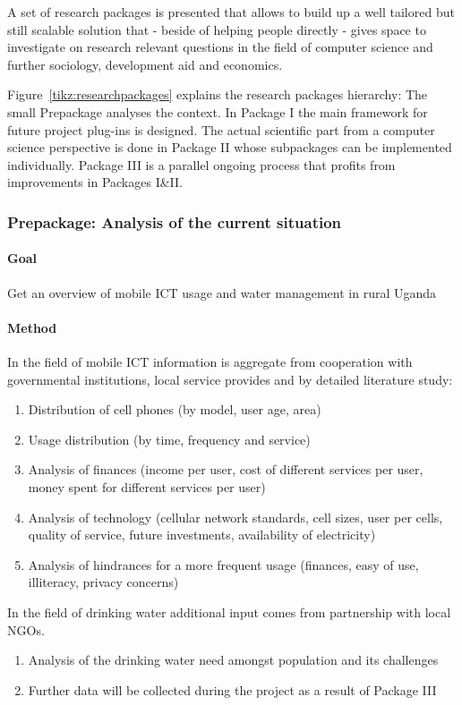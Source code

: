 \documentclass[11pt]{article}
\begin{document}
A set of research packages is presented that allows to build up a well tailored but still scalable solution that - beside of helping people directly -  gives space to investigate on research relevant questions in the field of computer science and further sociology, development aid and economics. 

Figure~\ref{tikz:researchpackages} explains the research packages hierarchy: The small Prepackage analyses the context. In Package I the main framework for future project plug-ins is designed. The actual scientific part from a computer science perspective is done in Package II whose subpackages can be implemented individually. Package III is a parallel ongoing process that profits from improvements in Packages I\&II.


\subsubsection*{Prepackage: Analysis of the current situation}
\paragraph{Goal} Get an overview of mobile ICT usage and water management in rural Uganda
\paragraph{Method}
In the field of mobile ICT information is aggregate from cooperation with governmental institutions, local service provides and by detailed literature study:
\begin{enumerate}
 \item Distribution of cell phones (by model, user age, area)
 \item Usage distribution (by time, frequency and service)
 \item Analysis of finances (income per user, cost of different services per user, money spent for different services per user)
 \item Analysis of technology (cellular network standards, cell sizes, user per cells, quality of service, future investments, availability of electricity)
 \item Analysis of hindrances for a more frequent usage (finances, easy of use, illiteracy, privacy concerns)
\end{enumerate}
In the field of drinking water additional input comes from partnership with local NGOs.
\begin{enumerate}
 \item Analysis of the drinking water need amongst population and its challenges
 \item Further data will be collected during the project as a result of Package III
\end{enumerate}
\end{document}

